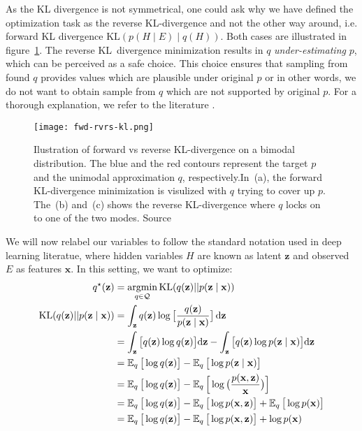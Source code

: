 As the KL divergence is not symmetrical, one could ask why we have defined the optimization task as the reverse KL-divergence and not the other way
around, i.e. forward KL divergence $\mathrm{KL}(p(H \mid E) \mid q(H))$. Both cases are illustrated in figure~\ref{fig:forward-reverse}. The reverse 
KL~divergence minimization results in $q$ \textit{under-estimating} $p$, which can be perceived as a safe choice. This choice ensures that sampling
from found $q$ provides values which are plausible under original $p$ or in other words, we do not want to obtain sample from $q$ which are not 
supported by original $p$. For a thorough explanation, we refer to the literature 
\cite{another-vb-intro-2021}.
\begin{figure}[t]
    \centering
    \texttt{[image: fwd-rvrs-kl.png]}
    \caption[Forward vs reverse KL divergence]{Ilustration of forward vs reverse KL-divergence on a bimodal distribution. The blue and the red contours represent the target $p$ 
    and the unimodal approximation $q$, respectively.In~(a), the forward KL-divergence minimization is visulized with $q$ trying to cover up $p$.
    The~(b) and~(c) shows the reverse KL-divergence where $q$ locks on to one of the two modes. Source~\cite{another-vb-intro-2021}}
    \label{fig:forward-reverse}
\end{figure}
We will now relabel our variables to follow
the standard notation used in deep learning literatue, where hidden variables $H$ are known as latent $\mathbf{z}$ and observed $E$ as features $\mathbf{x}$. 
In this setting, we want to optimize:
\begin{align}
    \label{eq:variational_bayes}
    q^\star(\mathbf{z}) &= \mathop{\rm argmin}_{q \in \mathcal{Q}} \mathrm{KL}(q(\mathbf{z}) || p(\mathbf{z} \mid \mathbf{x})) \\
    \mathrm{KL}(q(\mathbf{z}) || p(\mathbf{z} \mid \mathbf{x})) &= \int_\mathbf{z} q(\mathbf{z}) \log \big[ \frac{q(\mathbf{z})}{p(\mathbf{z}\mid\mathbf{x})} \big]\,\mbox{\rm d}\mathbf{z} \\
    &= \int_\mathbf{z} \big[q(\mathbf{z}) \log q(\mathbf{z})\big] \mbox{\rm d}\mathbf{z} - \int_\mathbf{z}  \big[q(\mathbf{z}) \log p(\mathbf{z}\mid \mathbf{x})\big] \mbox{\rm d}\mathbf{z} \\
    &= \operatorname{\mathbb{E}}_q \big[\log q(\mathbf{z})\big] - \operatorname{\mathbb{E}}_q \big[\log p(\mathbf{z}\mid \mathbf{x})\big] \\
    &= \operatorname{\mathbb{E}}_q \big[\log q(\mathbf{z})\big] - \operatorname{\mathbb{E}}_q \Big[\log \big( \frac{p(\mathbf{x},\mathbf{z})}{\mathbf{x}}\big) \Big] \\
    &= \operatorname{\mathbb{E}}_q \big[\log q(\mathbf{z})\big] - \operatorname{\mathbb{E}}_q \big[\log p(\mathbf{x},\mathbf{z})\big] + \operatorname{\mathbb{E}}_q \big[\log p(\mathbf{x})\big] \\
    &= \operatorname{\mathbb{E}}_q \big[\log q(\mathbf{z})\big] - \operatorname{\mathbb{E}}_q \big[\log p(\mathbf{x},\mathbf{z})\big] + \log p(\mathbf{x})
\end{align}
